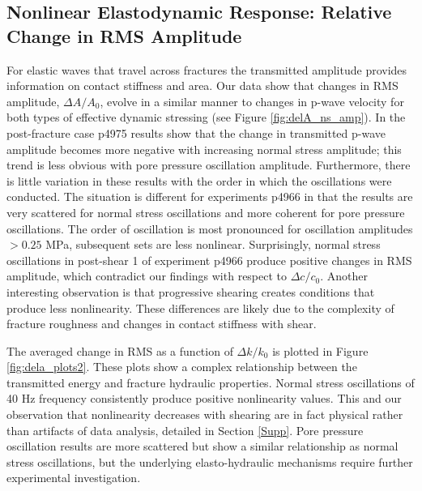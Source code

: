 \documentclass[letterpaper,10pt]{article}
\begin{document}
\clearpage


\subsection{Nonlinear Elastodynamic Response: Relative Change in RMS Amplitude}
For elastic waves that travel across fractures the transmitted amplitude provides information on contact stiffness and area. Our data show that changes in RMS amplitude, $ \Delta A/ A_0 $, evolve in a similar manner to changes in p-wave velocity for both types of effective dynamic stressing (see Figure \ref{fig:delA_ns_amp}). In the post-fracture case p4975 results show that the change in transmitted p-wave amplitude becomes more negative with increasing normal stress amplitude; this trend is less obvious with pore pressure oscillation amplitude. Furthermore, there is little variation in these results with the order in which the oscillations were conducted. The situation is different for experiments p4966 in that the results are very scattered for normal stress oscillations and more coherent for pore pressure oscillations. The order of oscillation is most pronounced for oscillation amplitudes $ > 0.25 $ MPa, subsequent sets are less nonlinear. Surprisingly, normal stress oscillations in post-shear 1 of experiment p4966 produce positive changes in RMS amplitude, which contradict our findings with respect to $ \Delta c/c_0 $. Another interesting observation is that progressive shearing creates conditions that produce less nonlinearity. These differences are likely due to the complexity of fracture roughness and changes in contact stiffness with shear.

The averaged change in RMS as a function of $ \Delta k/k_0 $ is plotted in Figure \ref{fig:dela_plots2}. These plots show a complex relationship between the transmitted energy and fracture hydraulic properties. Normal stress oscillations of 40 Hz frequency consistently produce positive nonlinearity values. This and our observation that nonlinearity decreases with shearing are in fact physical rather than artifacts of data analysis, detailed in Section \ref{Supp}. Pore pressure oscillation results are more scattered but show a similar relationship as normal stress oscillations, but the underlying elasto-hydraulic mechanisms require further experimental investigation.

\clearpage
\end{document}
